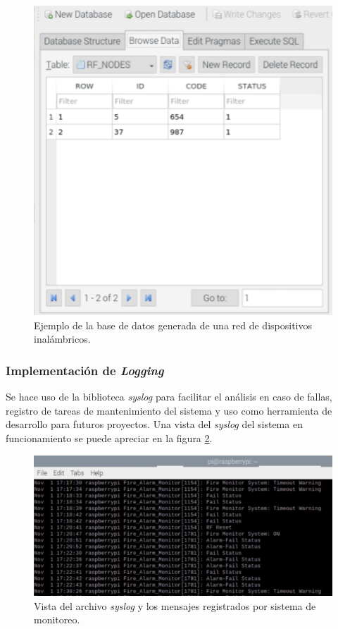 \begin{figure}[ht]
	\centering
	\includegraphics[scale=.45]{./Figures/Capitulo4/Figura_O.png}
	\caption{Ejemplo de la base de datos generada de una red de dispositivos inalámbricos.}
	\label{fig:figura_o}
\end{figure}

\break

\subsubsection{Implementación de \textit{Logging} }
Se hace uso de la biblioteca \textit{syslog} para facilitar el análisis en caso de fallas, registro de tareas de mantenimiento del sistema y uso como herramienta de desarrollo para futuros proyectos. Una vista del \textit{syslog} del sistema en funcionamiento se puede apreciar en la figura \ref{fig:figura_q}.


\begin{figure}[ht]
	\centering
	\includegraphics[scale=.65]{./Figures/Capitulo4/Figura_Q.png}
	\caption{Vista del archivo \textit{syslog} y los mensajes registrados por sistema de monitoreo.}
	\label{fig:figura_q}
\end{figure}

